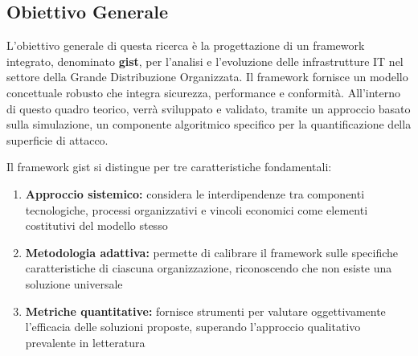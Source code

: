 \subsection{\texorpdfstring{\textbf{Obiettivo Generale}}{1.3.1 - Obiettivo Generale}}
\label{subsec:obiettivo_generale}

L'obiettivo generale di questa ricerca è la progettazione di un framework integrato, denominato \textbf{\gls{gist}}, per l'analisi e l'evoluzione delle infrastrutture IT nel settore della Grande Distribuzione Organizzata. Il framework fornisce un modello concettuale robusto che integra sicurezza, performance e conformità. All'interno di questo quadro teorico, verrà sviluppato e validato, tramite un approccio basato sulla simulazione, un componente algoritmico specifico per la quantificazione della superficie di attacco.

Il framework \gls{gist} si distingue per tre caratteristiche fondamentali:

\begin{enumerate}
\item \textbf{Approccio sistemico:} considera le interdipendenze tra componenti tecnologiche, processi organizzativi e vincoli economici come elementi costitutivi del modello stesso

\item \textbf{Metodologia adattiva:} permette di calibrare il framework sulle specifiche caratteristiche di ciascuna organizzazione, riconoscendo che non esiste una soluzione universale

\item \textbf{Metriche quantitative:} fornisce strumenti per valutare oggettivamente l'efficacia delle soluzioni proposte, superando l'approccio qualitativo prevalente in letteratura
\end{enumerate}

